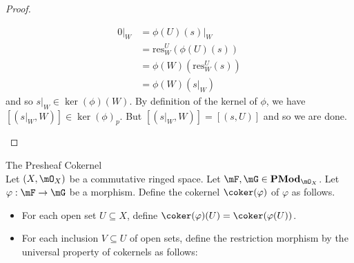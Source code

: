 \documentclass[a4paper]{article}
\begin{document}
\begin{prp}{}{}
\begin{proof}
\begin{itemize}
\begin{align*}
0|_W&=\phi(U)(s)|_W\\
&=\text{res}_W^U(\phi(U)(s))\\
&=\phi(W)(\text{res}_W^U(s))\tag{$\phi$ is a morphism}\\
&=\phi(W)(s|_W)
\end{align*}
and so $s|_W\in\ker(\phi)(W)$. By definition of the kernel of $\phi$, we have $[(s|_W,W)]\in\ker(\phi)_p$. But $[(s|_W,W)]=[(s,U)]$ and so we are done. \\

\end{itemize}
\end{proof}
\end{prp}

\begin{defn}{The Presheaf Cokernel}{}\\
Let $(X,\mO_X)$ be a commutative ringed space. Let $\mF,\mG\in\bold{PMod}_{\mO_X}$. Let $\varphi:\mF\to\mG$ be a morphism. Define the cokernel $\coker(\varphi)$ of $\varphi$ as follows. 
\begin{itemize}
\item For each open set $U\subseteq X$, define $\coker(\varphi)(U)=\coker(\varphi(U))$. 
\item For each inclusion $V\subseteq U$ of open sets, define the restriction morphism by the universal property of cokernels as follows: \\
 \\~\\
\end{itemize}
\end{defn}
\end{document}
